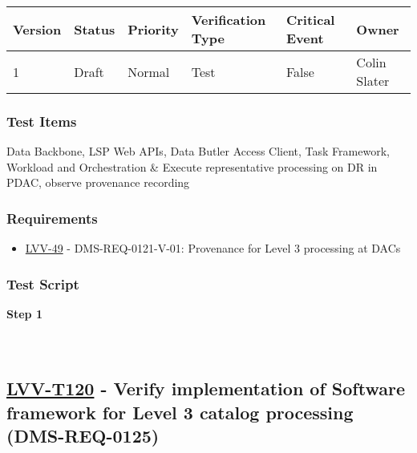 \begin{longtable}[]{@{}llllll@{}}
\toprule
Version & Status & Priority & Verification Type & Critical Event &
Owner\tabularnewline
\midrule
\endhead
1 & Draft & Normal & Test & False & Colin Slater\tabularnewline
\bottomrule
\end{longtable}

\hypertarget{test-items-19}{%
\subsubsection{Test Items}\label{test-items-19}}

Data Backbone, LSP Web APIs, Data Butler Access Client, Task Framework,
Workload and Orchestration \& Execute representative processing on DR in
PDAC, observe provenance recording

\hypertarget{requirements-19}{%
\subsubsection{Requirements}\label{requirements-19}}

\begin{itemize}
\tightlist
\item
  \href{https://jira.lsstcorp.org/browse/LVV-49}{LVV-49} -
  DMS-REQ-0121-V-01: Provenance for Level 3 processing at DACs
\end{itemize}

\hypertarget{test-script-19}{%
\subsubsection{Test Script}\label{test-script-19}}

\textbf{Step 1}\\
~\\
~\\

\hypertarget{lvv-t120---verify-implementation-of-software-framework-for-level-3-catalog-processing-dms-req-0125}{%
\subsection{\texorpdfstring{\href{https://jira.lsstcorp.org/secure/Tests.jspa\#/testCase/LVV-T120}{LVV-T120}
- Verify implementation of Software framework for Level 3 catalog
processing
(DMS-REQ-0125)}{LVV-T120 - Verify implementation of Software framework for Level 3 catalog processing (DMS-REQ-0125)}}\label{lvv-t120---verify-implementation-of-software-framework-for-level-3-catalog-processing-dms-req-0125}}

